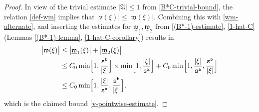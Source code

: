 \documentclass[12pt, twoside]{article}
\theoremstyle{definition}
\numberwithin{equation}{section}
\begin{document}
\begin{proof}
In view of the trivial estimate $|\mathfrak A| \leq 1$ from \eqref{B*C-trivial-bound}, the relation \eqref{def-wm} implies that $|\mathtt v(\xi)| \leq |\mathfrak w(\xi)|$.  
Combining this with \eqref{wm-alternate}, and inserting the estimates for $\underline{\mathfrak w}_1, \underline{\mathfrak w}_2$ from \eqref{(B*-1)-estimate}, \eqref{1-hat-C} (Lemmas \ref{(B*-1)-lemma}, \ref{1-hat-C-corollary}) results in  
\begin{align*} 
 \bigl|\mathfrak w(\xi)  \bigr| & \leq \bigl| \underline{\mathfrak w}_1(\xi) \bigr| + \bigl|\underline{\mathfrak w}_2(\xi)  \bigr| \\ 
&\leq C_0  \min \Bigl[1, \frac{\mathtt s^{\mathtt b}}{|\xi|}\Bigr] \times \min \Bigl[1, \frac{|\xi|}{\mathtt s^{\mathtt a}}\Bigr] + C_0 \min \Bigl[1, \frac{|\xi|}{\mathtt s^{\mathtt a}}, \frac{\mathtt s^{\mathtt b}}{|\xi|} \Bigr] \\ 
&\leq C_0 \min \Bigl[1, \frac{|\xi|}{\mathtt s^{\mathtt a}}, \frac{\mathtt s^{\mathtt b}}{|\xi|} \Bigr],
\end{align*}
which is the claimed bound \eqref{v-pointwise-estimate}. 
\end{proof} 
\end{document}
